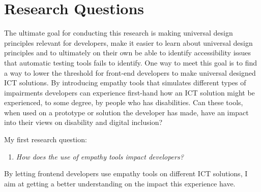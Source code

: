\section{Research Questions}
The ultimate goal for conducting this research is making universal design principles relevant for developers, make it easier to learn about universal design principles and to ultimately on their own be able to identify accessibility issues that automatic testing tools fails to identify. One way to meet this goal is to find a way to lower the threshold for front-end developers to make universal designed ICT solutions. By introducing empathy tools that simulates different types of impairments developers can experience first-hand how an ICT solution might be experienced, to some degree, by people who has disabilities. Can these tools, when used on a prototype or solution the developer has made, have an impact into their views on disability and digital inclusion?



 
My first research question:  


\begin{enumerate} 
\item \textit{How does the use of empathy tools impact developers?}

\end{enumerate} 
By letting frontend developers use empathy tools on different ICT solutions, I aim at getting a better understanding on the impact this experience have.

